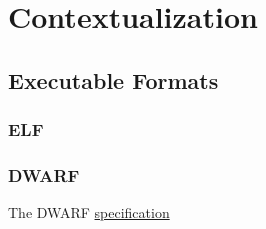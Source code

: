 
\chapter{Contextualization}

\section{Executable Formats}

\subsection{ELF}
\subsection{DWARF}

The DWARF \href{http://dwarfstd.org}{specification}

